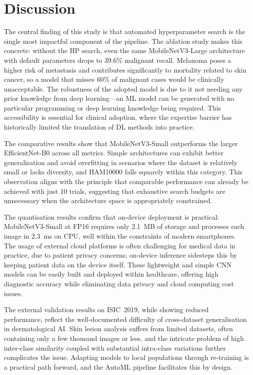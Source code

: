 \documentclass[conference]{IEEEtran}
\begin{document}
\section{Discussion}
 
The central finding of this study is that automated hyperparameter search is the single most impactful component of the pipeline. The ablation study makes this concrete: without the HP search, even the same MobileNetV3-Large architecture with default parameters drops to 39.6\% malignant recall. Melanoma poses a higher risk of metastasis and contributes significantly to mortality related to skin cancer, so a model that misses 60\% of malignant cases would be clinically unacceptable. The robustness of the adopted model is due to it not needing any prior knowledge from deep learning---an ML model can be generated with no particular programming or deep learning knowledge being required. This accessibility is essential for clinical adoption, where the expertise barrier has historically limited the translation of DL methods into practice.
 
The comparative results show that MobileNetV3-Small outperforms the larger EfficientNet-B0 across all metrics. Simple architectures can exhibit better generalisation and avoid overfitting in scenarios where the dataset is relatively small or lacks diversity, and HAM10000 falls squarely within this category. This observation aligns with the principle that comparable performance can already be achieved with just 10 trials, suggesting that exhaustive search budgets are unnecessary when the architecture space is appropriately constrained.
 
The quantisation results confirm that on-device deployment is practical: MobileNetV3-Small at FP16 requires only 2.1~MB of storage and processes each image in 2.3~ms on CPU, well within the constraints of modern smartphones. The usage of external cloud platforms is often challenging for medical data in practice, due to patient privacy concerns; on-device inference sidesteps this by keeping patient data on the device itself. These lightweight and simple CNN models can be easily built and deployed within healthcare, offering high diagnostic accuracy while eliminating data privacy and cloud computing cost issues.
 
The external validation results on ISIC~2019, while showing reduced performance, reflect the well-documented difficulty of cross-dataset generalisation in dermatological AI. Skin lesion analysis suffers from limited datasets, often containing only a few thousand images or less, and the intricate problem of high inter-class similarity coupled with substantial intra-class variations further complicates the issue. Adapting models to local populations through re-training is a practical path forward, and the AutoML pipeline facilitates this by design.
 
\end{document}
